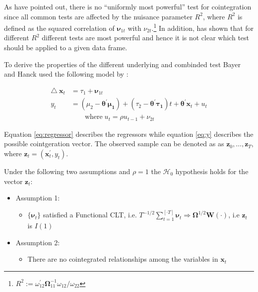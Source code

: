 \documentclass[11pt,a4paper]{article}
\let\rmarkdownfootnote\footnote%
\def\footnote{\protect\rmarkdownfootnote}
\begin{document}
As \textcite{Bayerhanck2009} have pointed out, there is no
\enquote{uniformly most powerful} test for cointegration since all
common tests are affected by the nuisance parameter \(R^2\), where
\(R^2\) is defined as the squared correlation of \(\pmb{\nu}_{1t}\) with
\(\nu_{2t}\).\footnote{\(R^2:= \omega_{12}^{'} \pmb{\Omega}_{11}^{-1}\omega_{12} / \omega_{22}\)}
In addition, \textcite{pesavento2004} has shown that for different
\(R^2\) different tests are most powerful and hence it is not clear
which test should be applied to a given data frame.

To derive the properties of the different underlying and combinded test
Bayer and Hanck used the following model by \textcite{pesavento2004}:

\begin{align}
  \label{eq:regressor}
  \triangle \ \pmb{x}_t & = \tau_1 +  \pmb{\nu}_{1t}\\
  \label{eq:y}
  y_t & = \left( \mu_2 - \pmb{\theta^{'} \mu_1} \right) + \left( \tau_2 - \pmb{\theta^{'} \tau_1} \right)t + \pmb{\theta^{'} x}_t + u_t \\
  & \qquad \text{where} \; u_t = \rho u_{t-1} + \nu_{2t} \nonumber
\end{align}

Equation \eqref{eq:regressor} describes the regressors while equation
\eqref{eq:y} describes the possible cointgeration vector. The observed
sample can be denoted as as \(\pmb{z}_0, \ldots , \pmb{z}_T\), where
\(\pmb{z}_t = (\pmb{x}_t^{'}, y_t)\).

Under the following two assumptions and \(\rho = 1\) the
\(\mathcal{H}_0\) hypothesis holds for the vector \(\pmb{z}_t\):

\begin{itemize}
  \item[] Assumption 1: 
  \begin{itemize}
    \item[] $\{ \pmb{\nu}_t \}$ satisfied a Functional CLT, i.e. $\displaystyle T^{-1/2} \sum_{t = 1}^{[\cdot T]} \pmb{\nu}_t \Rightarrow \pmb{\Omega}^{1/2} \pmb{W}(\cdot)$, i.e $\pmb{z}_t$ is $I(1)$  
  \end{itemize}
  \item[] Assumption 2:
  \begin{itemize}
    \item[] There are no cointegrated relationships among the variables in $\pmb{x}_t$
  \end{itemize}
\end{itemize}
\end{document}
